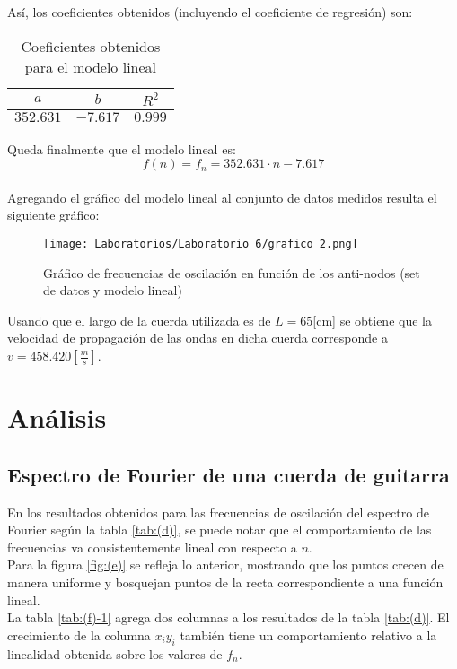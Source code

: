 \documentclass[letterpaper,11pt]{article} %
\begin{document}
Así, los coeficientes obtenidos (incluyendo el coeficiente de regresión) son:
\begin{table}[H]
    \centering
    \begin{tabular}{|c|c|c|} \hline
         $a$ & $b$ & $R^2$ \\ \hline
         $352.631$ & $-7.617$ & $0.999$ \\ \hline
    \end{tabular}
    \caption{Coeficientes obtenidos para el modelo lineal}
    \label{tab:(f)-3}
\end{table}
    
Queda finalmente que el modelo lineal es:
$$f(n)=f_n = 352.631\cdot n - 7.617$$
\\

Agregando el gráfico del modelo lineal al conjunto de datos medidos resulta el siguiente gráfico:
\begin{figure}
    \centering
    \texttt{[image: Laboratorios/Laboratorio 6/grafico 2.png]}
    \caption{Gráfico de frecuencias de oscilación en función de los anti-nodos (set de datos y modelo lineal)}
    \label{fig:(g)}
\end{figure}

Usando que el largo de la cuerda utilizada es de $L=65$[cm] se obtiene que la velocidad de propagación de las ondas en dicha cuerda corresponde a $v=458.420 [\frac{m}{s}]$.

\newpage\section{Análisis}
\subsection{Espectro de Fourier de una cuerda de guitarra}
En los resultados obtenidos para las frecuencias de oscilación del espectro de Fourier según la tabla \ref{tab:(d)}, se puede notar que el comportamiento de las frecuencias va consistentemente lineal con respecto a $n$. \\

Para la figura \ref{fig:(e)} se refleja lo anterior, mostrando que los puntos crecen de manera uniforme y bosquejan puntos de la recta correspondiente a una función lineal. \\

La tabla \ref{tab:(f)-1} agrega dos columnas a los resultados de la tabla \ref{tab:(d)}. El crecimiento de la columna $x_i y_i$ también tiene un comportamiento relativo a la linealidad obtenida sobre los valores de $f_n$. \\
\end{document}
